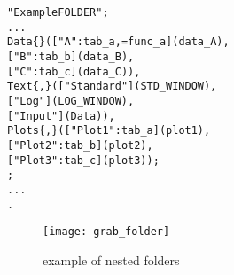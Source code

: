 \begin{boxedminipage}[t]{\linewidth}
\begin{alltt}
\DESCRIPTION "Example FOLDER";
  ...
\UIMANAGER
 \FOLDER
   Data \{ \LEFT \} (  ["A" : tab_a, \FUNC = func_a ] (data_A),
                     ["B" : tab_b ] (data_B),
                     ["C" : tab_c ] (data_C)                       ),
   Text \{ \LEFT, \STRETCH \}(  ["Standard"] (STD_WINDOW),
                               ["Log"]      (LOG_WINDOW),
                               ["Input"]    (Data)                 ),
   Plots \{ \TOP, \VERTICAL \} (  ["Plot 1" : tab_a ] (plot1),
                                 ["Plot 2" : tab_b ] (plot2),
                                 ["Plot 3" : tab_c ] (plot3)       );
\END \UIMANAGER;
  ...
\END.
\end{alltt}
\end{boxedminipage}


\begin{figure}[h]\label{fig:folders}
  \begin{center}
    \texttt{[image: grab\_folder]}
  \end{center}
  \caption{example of nested folders}
\end{figure}
